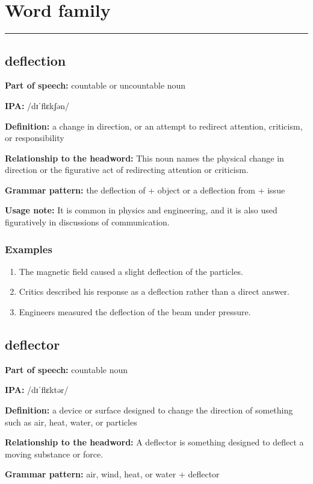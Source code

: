\documentclass[11pt]{article}
\newcommand{\sectionrule}{\par\vspace{-0.5em}\noindent\textcolor{Accent}{\rule{\linewidth}{0.6pt}}\par}
\begin{document}
\section{Word family}
\sectionrule
\subsection{deflection}
\textbf{Part of speech:} countable or uncountable noun

\textbf{IPA:} /dɪˈflɛkʃən/

\textbf{Definition:} a change in direction, or an attempt to redirect attention, criticism, or responsibility

\textbf{Relationship to the headword:} This noun names the physical change in direction or the figurative act of redirecting attention or criticism.

\textbf{Grammar pattern:} the deflection of + object or a deflection from + issue

\textbf{Usage note:} It is common in physics and engineering, and it is also used figuratively in discussions of communication.

\subsubsection{Examples}
\begin{enumerate}
  \item The magnetic field caused a slight deflection of the particles.
  \item Critics described his response as a deflection rather than a direct answer.
  \item Engineers measured the deflection of the beam under pressure.
\end{enumerate}

\subsection{deflector}
\textbf{Part of speech:} countable noun

\textbf{IPA:} /dɪˈflɛktər/

\textbf{Definition:} a device or surface designed to change the direction of something such as air, heat, water, or particles

\textbf{Relationship to the headword:} A deflector is something designed to deflect a moving substance or force.

\textbf{Grammar pattern:} air, wind, heat, or water + deflector
\end{document}
